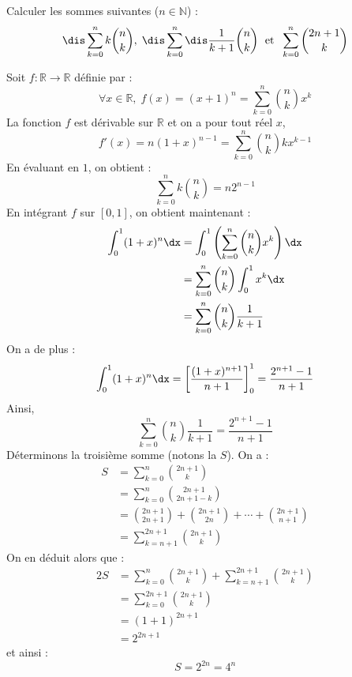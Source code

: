 \documentclass[a4paper,10pt]{report}
\begin{document}
\begin{Exa} Calculer les sommes suivantes ($n \in \mathbb{N}$) : 
$$\dis\sum_{k=0}^n k \binom{n}{k}, \; \dis\sum_{k=0}^n\dis\frac{1}{k+1} \binom{n}{k} \; \hbox{ et } \; \sum_{k=0}^n \binom{2n+1}{k}$$
\end{Exa}

\corr Soit $f : \mathbb{R} \rightarrow \mathbb{R}$ définie par :
$$ \forall x \in \mathbb{R}, \; f(x)=(x+1)^n = \sum_{k=0}^n \binom{n}{k} x^k$$
La fonction $f$ est dérivable sur $\mathbb{R}$ et on a pour tout réel $x$,
$$ f'(x) = n(1+x)^{n-1}=  \sum_{k=0}^n \binom{n}{k} k x^{k-1} $$
En évaluant en $1$, on obtient :
$$ \sum_{k=0}^n k \binom{n}{k}  = n2^{n-1}$$
En intégrant $f$ sur $[0,1]$, on obtient maintenant :
\begin{align*}
\int_0^1 (1+x)^n \dx & = \int_0^1 \left( \sum_{k=0}^n \binom{n}{k} x^k \right) \dx \\
& = \sum_{k=0}^n \binom{n}{k} \int_0^1 x^k \dx \\
& = \sum_{k=0}^n \binom{n}{k} \dfrac{1}{k+1}
\end{align*}
On a de plus :
$$ \int_0^1 (1+x)^n \dx  = \left[ \dfrac{(1+x)^{n+1}}{n+1} \right]_0^1 = \dfrac{2^{n+1}-1}{n+1}$$
Ainsi,
$$ \sum_{k=0}^n \binom{n}{k} \dfrac{1}{k+1} = \dfrac{2^{n+1}-1}{n+1}$$
Déterminons la troisième somme (notons la $S$). On a :
\begin{align*}
S & = \sum_{k=0}^{n} \binom{2n+1}{k} \\
& = \sum_{k=0}^{n} \binom{2n+1}{2n+1-k} \\
& = \binom{2n+1}{2n+1} + \binom{2n+1}{2n} + \cdots + \binom{2n+1}{n+1} \\
& = \sum_{k=n+1}^{2n+1} \binom{2n+1}{k}
\end{align*}
On en déduit alors que :
\begin{align*}
2S &  = \sum_{k=0}^{n} \binom{2n+1}{k} + \sum_{k=n+1}^{2n+1} \binom{2n+1}{k} \\
& = \sum_{k=0}^{2n+1} \binom{2n+1}{k} \\
& = (1+1)^{2n+1} \\
& = 2^{2n+1} 
\end{align*}
et ainsi :
$$  S= 2^{2n} = 4^n $$
\end{document}
